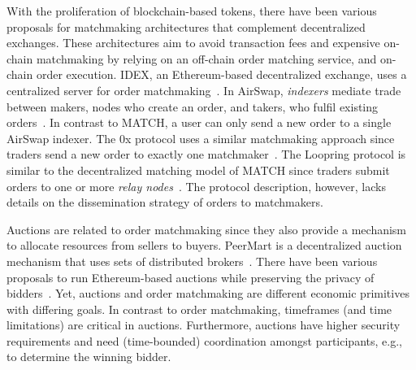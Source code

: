 With the proliferation of blockchain-based tokens, there have been various proposals for matchmaking architectures that complement decentralized exchanges.
These architectures aim to avoid transaction fees and expensive on-chain matchmaking by relying on an off-chain order matching service, and on-chain order execution.
IDEX, an Ethereum-based decentralized exchange, uses a centralized server for order matchmaking~\cite{idex}.
In AirSwap, \emph{indexers} mediate trade between makers, nodes who create an order, and takers, who fulfil existing orders~\cite{swap}. %
In contrast to MATCH, a user can only send a new order to a single AirSwap indexer.
The 0x protocol uses a similar matchmaking approach since traders send a new order to exactly one matchmaker~\cite{warren20170x}.
The Loopring protocol is similar to the decentralized matching model of MATCH since traders submit orders to one or more \emph{relay nodes}~\cite{loopring}.
The protocol description, however, lacks details on the dissemination strategy of orders to matchmakers.

Auctions are related to order matchmaking since they also provide a mechanism to allocate resources from sellers to buyers.
PeerMart is a decentralized auction mechanism that uses sets of distributed brokers~\cite{haussheer2005decentralized}.
There have been various proposals to run Ethereum-based auctions while preserving the privacy of bidders~\cite{galal2018verifiable,galal2018succinctly}.
Yet, auctions and order matchmaking are different economic primitives with differing goals.
In contrast to order matchmaking, timeframes (and time limitations) are critical in auctions.
Furthermore, auctions have higher security requirements and need (time-bounded) coordination amongst participants, e.g., to determine the winning bidder.


